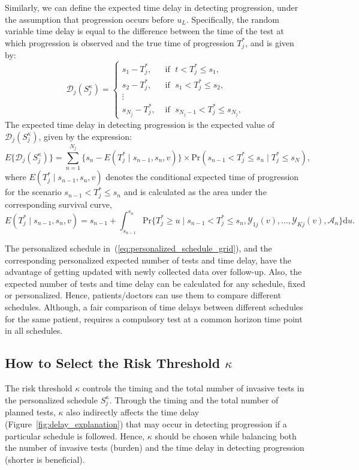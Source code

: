 \documentclass[useAMS, usenatbib, referee]{biom}
\begin{document}
Similarly, we can define the expected time delay in detecting progression, under the assumption that progression occurs before $u_L$. Specifically, the random variable time delay is equal to the difference between the time of the test at which progression is observed and the true time of progression $T_j^*$, and is given by:
\[
\mathcal D_j (S^\kappa_j) = \left \{
\begin{array}{ll}
s_1 - T_j^*, & \mbox{ if } \; t < T^*_j \leq s_1,\\
s_2 - T_j^*, & \mbox{ if } \; s_1 < T^*_j \leq s_2,\\
\vdots&\\
s_{N_j} - T_j^*, & \mbox{ if } \; s_{N_j-1} < T^*_j \leq s_{N_j},
\end{array}
\right.
\]
The expected time delay in detecting progression is the expected value of $\mathcal D_j (S^\kappa_j)$, given by the expression:
\begin{equation*}
\label{eq:exp_delay}
E \big \{ \mathcal D_j(S^\kappa_j)\big\} = \sum_{n = 1}^{N_j} \Big\{s_n - E(T^*_j \mid s_{n-1}, s_n, v)\Big\} \times \mbox{Pr}(s_{n-1} < T^*_j \leq s_n\mid T^*_j \leq s_N),
\end{equation*}
where $E(T^*_j \mid s_{n-1}, s_n, v)$ denotes the conditional expected time of progression for the scenario $s_{n-1} < T^*_j \leq s_n$ and is calculated as the area under the corresponding survival curve,
\begin{equation*}
E(T^*_j \mid s_{n-1}, s_n, v) = s_{n-1} + \int_{s_{n-1}}^{s_n} \mbox{Pr}\Big\{T^*_j \geq u \mid s_{n-1} < T^*_j \leq s_n, \mathcal{Y}_{1j}(v), \ldots, \mathcal{Y}_{Kj}(v), \mathcal{A}_n\Big\} \mathrm{d}u.
\end{equation*}

The personalized schedule in~(\ref{eq:personalized_schedule_grid}), and the corresponding personalized expected number of tests and time delay, have the advantage of getting updated with newly collected data over follow-up. Also, the expected number of tests and time delay can be calculated for any schedule, fixed or personalized. Hence, patients/doctors can use them to compare different schedules. Although, a fair comparison of time delays between different schedules for the same patient, requires a compulsory test at a common horizon time point in all schedules.

\subsection{How to Select the Risk Threshold $\kappa$}
\label{subsec:kappa_selection}
The risk threshold $\kappa$ controls the timing and the total number of invasive tests in the personalized schedule $S^\kappa_j$. Through the timing and the total number of planned tests, $\kappa$ also indirectly affects the time delay (Figure~\ref{fig:delay_explanation}) that may occur in detecting progression if a particular schedule is followed. Hence, $\kappa$ should be chosen while balancing both the number of invasive tests (burden) and the time delay in detecting progression (shorter is beneficial).
\end{document}
